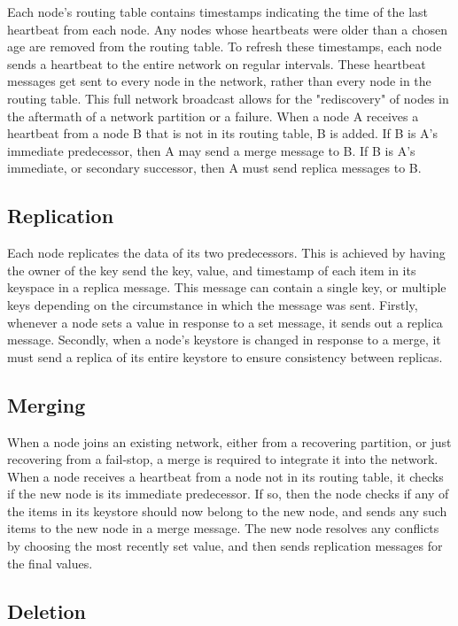\documentclass[11pt]{article}
\begin{document}
Each node's routing table contains timestamps indicating the time of the last heartbeat from each node. Any nodes whose heartbeats were older than a chosen age are removed from the routing table. To refresh these timestamps, each node sends a heartbeat to the entire network on regular intervals. These heartbeat messages get sent to every node in the network, rather than every node in the routing table. This full network broadcast allows for the "rediscovery" of nodes in the aftermath of a network partition or a failure. When a node A receives a heartbeat from a node B that is not in its routing table, B is added. If B is A's immediate predecessor, then A may send a merge message to B. If B is A's immediate, or secondary successor, then A must send replica messages to B.

\subsection{Replication}\label{sec:Rep}

Each node replicates the data of its two predecessors. This is achieved by having the owner of the key send the key, value, and timestamp of each item in its keyspace in a replica message. This message can contain a single key, or multiple keys depending on the circumstance in which the message was sent. Firstly, whenever a node sets a value in response to a set message, it sends out a replica message. Secondly, when a node's keystore is changed in response to a merge, it must send a replica of its entire keystore to ensure consistency between replicas.

\subsection{Merging}\label{sec:Merg}

When a node joins an existing network, either from a recovering partition, or just recovering from a fail-stop, a merge is required to integrate it into the network. When a node receives a heartbeat from a node not in its routing table, it checks if the new node is its immediate predecessor. If so, then the node checks if any of the items in its keystore should now belong to the new node, and sends any such items to the new node in a merge message. The new node resolves any conflicts by choosing the most recently set value, and then sends replication messages for the final values.

\subsection{Deletion}\label{sec:Del}
\end{document}
